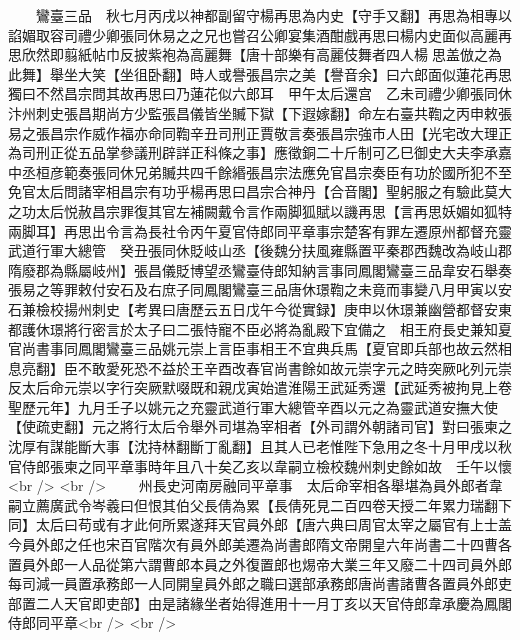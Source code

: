 　　鸞臺三品　秋七月丙戌以神都副留守楊再思為内史【守手又翻】再思為相專以諂媚取容司禮少卿張同休易之之兄也嘗召公卿宴集酒酣戲再思曰楊内史面似高麗再思欣然即翦紙帖巾反披紫袍為高麗舞【唐十部樂有高麗伎舞者四人楊思盖倣之為此舞】舉坐大笑【坐徂卧翻】時人或譽張昌宗之美【譽音余】曰六郎面似蓮花再思獨曰不然昌宗問其故再思曰乃蓮花似六郎耳　甲午太后還宫　乙未司禮少卿張同休汴州刺史張昌期尚方少監張昌儀皆坐贓下獄【下遐嫁翻】命左右臺共鞫之丙申敕張易之張昌宗作威作福亦命同鞫辛丑司刑正賈敬言奏張昌宗強市人田【光宅改大理正為司刑正從五品掌參議刑辟詳正科條之事】應徵銅二十斤制可乙巳御史大夫李承嘉中丞桓彦範奏張同休兄弟贓共四千餘緡張昌宗法應免官昌宗奏臣有功於國所犯不至免官太后問諸宰相昌宗有功乎楊再思曰昌宗合神丹【合音閣】聖躬服之有驗此莫大之功太后悦赦昌宗罪復其官左補闕戴令言作兩脚狐賦以譏再思【言再思妖媚如狐特兩脚耳】再思出令言為長社令丙午夏官侍郎同平章事宗楚客有罪左遷原州都督充靈武道行軍大總管　癸丑張同休貶岐山丞【後魏分扶風雍縣置平秦郡西魏改為岐山郡隋廢郡為縣屬岐州】張昌儀貶博望丞鸞臺侍郎知納言事同鳳閣鸞臺三品韋安石舉奏張易之等罪敕付安石及右庶子同鳳閣鸞臺三品唐休璟鞫之未竟而事變八月甲寅以安石兼檢校揚州刺史【考異曰唐歷云五日戊午今從實録】庚申以休璟兼幽營都督安東都護休璟將行密言於太子曰二張恃寵不臣必將為亂殿下宜備之　相王府長史兼知夏官尚書事同鳳閣鸞臺三品姚元崇上言臣事相王不宜典兵馬【夏官即兵部也故云然相息亮翻】臣不敢愛死恐不益於王辛酉改春官尚書餘如故元崇字元之時突厥叱列元崇反太后命元崇以字行突厥默啜既和親戊寅始遣淮陽王武延秀還【武延秀被拘見上卷聖歷元年】九月壬子以姚元之充靈武道行軍大總管辛酉以元之為靈武道安撫大使【使疏吏翻】元之將行太后令舉外司堪為宰相者【外司謂外朝諸司官】對曰張柬之沈厚有謀能斷大事【沈持林翻斷丁亂翻】且其人已老惟陛下急用之冬十月甲戌以秋官侍郎張柬之同平章事時年且八十矣乙亥以韋嗣立檢校魏州刺史餘如故　壬午以懷<br />
<br />
　　州長史河南房融同平章事　太后命宰相各舉堪為員外郎者韋嗣立薦廣武令岑羲曰但恨其伯父長倩為累【長倩死見二百四卷天授二年累力瑞翻下同】太后曰苟或有才此何所累遂拜天官員外郎【唐六典曰周官太宰之屬官有上士盖今員外郎之任也宋百官階次有員外郎美遷為尚書郎隋文帝開皇六年尚書二十四曹各置員外郎一人品從第六謂曹郎本員之外復置郎也焬帝大業三年又廢二十四司員外郎每司減一員置承務郎一人同開皇員外郎之職曰選部承務郎唐尚書諸曹各置員外郎吏部置二人天官即吏部】由是諸緣坐者始得進用十一月丁亥以天官侍郎韋承慶為鳳閣侍郎同平章<br />
<br />
